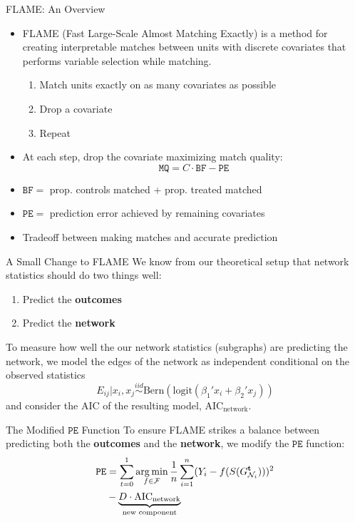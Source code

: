 \documentclass[newPxFont,numfooter,sectionpages]{beamer}
\DeclareMathOperator*{\argmin}{arg\,min}
\newcommand{\bt}{\mathbf{t}}
\newcommand{\Gnit}{G_{\mathcal{N}_i}^\bt}
\begin{document}
\begin{frame}{FLAME: An Overview}
	\begin{itemize}
		\item FLAME (Fast Large-Scale Almost Matching Exactly) is a method for creating interpretable matches between units with discrete covariates that performs variable selection while matching.
		\begin{enumerate}
			\item Match units exactly on as many covariates as possible
			\item Drop a covariate
			\item Repeat
		\end{enumerate}
		\item At each step, drop the covariate maximizing match quality:
		\[\mathtt{MQ} = C \cdot \mathtt{BF} - \mathtt{PE}\]
		\item $\mathtt{BF} = $ prop. controls matched + prop. treated matched
		\item $\mathtt{PE} = $ prediction error achieved by remaining covariates
		\item Tradeoff between making matches and accurate prediction
	\end{itemize}
\end{frame}
\begin{frame}{A Small Change to FLAME}
We know from our theoretical setup that network statistics should do two things well:
\begin{enumerate}
  \item Predict the \textbf{outcomes}
  \item Predict the \textbf{network}
\end{enumerate}
To measure how well the our network statistics (subgraphs) are predicting the network, we model the edges of the network as independent conditional on the observed statistics
\[E_{ij}|x_i, x_j \stackrel{iid}{\sim} \textrm{Bern}(\textrm{logit}(\beta_1'x_i + \beta_2'x_j))\]
and consider the AIC of the resulting model, $\text{AIC}_{\text{network}}$.
\end{frame}

\begin{frame}{The Modified $\mathtt{PE}$ Function}
	To ensure FLAME strikes a balance between predicting both the \textbf{outcomes} and the \textbf{network}, we modify the $\mathtt{PE}$ function:
\begin{align*}
	{\tt PE} &= \sum_{t = 0}^1\argmin_{f \in \mathcal{F}}\frac{1}{n}\sum_{i = 1}^n(Y_i - f(S(\Gnit)))^2\\
         &- \underbrace{D\cdot \text{AIC}_{\text{network}}}_{\text{new component}}
\end{align*}
\end{frame}
\end{document}
